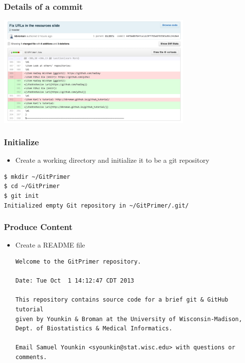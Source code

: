 \documentclass[12pt,t]{beamer}
\newcommand{\bbi}{\vspace{24pt} \begin{itemize} \itemsep8pt}
\newcommand{\ei}{\end{itemize}}
\begin{document}
\begin{frame}
\frametitle{Details of a commit}

\vfill
\includegraphics[height=2.2in]{a_commit.png}
\end{frame}


\begin{frame}[fragile]
\frametitle{Initialize}
\bbi
\item Create a working directory and initialize it to be a git
  repository
\ei
\begin{semiverbatim}
\begin{lstlisting}
$ mkdir ~/GitPrimer
$ cd ~/GitPrimer
$ git init
Initialized empty Git repository in ~/GitPrimer/.git/
\end{lstlisting}
\end{semiverbatim}
\end{frame}

\begin{frame}[fragile]
\frametitle{Produce Content}
\bbi
\item Create a README file

\begin{semiverbatim}
\begin{lstlisting}
Welcome to the GitPrimer repository.

Date: Tue Oct  1 14:12:47 CDT 2013

This repository contains source code for a brief git & GitHub tutorial
given by Younkin & Broman at the University of Wisconsin-Madison,
Dept. of Biostatistics & Medical Informatics.

Email Samuel Younkin <syounkin@stat.wisc.edu> with questions or
comments.
\end{lstlisting}
\end{semiverbatim}
\ei
\end{frame}
\end{document}
